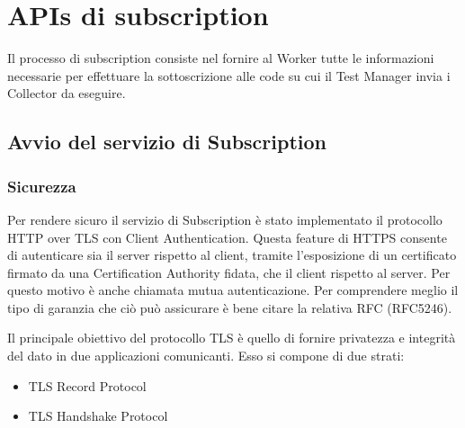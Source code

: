 \section{APIs di subscription}
Il processo di subscription consiste nel fornire al Worker tutte le informazioni necessarie per effettuare la sottoscrizione alle code su cui il Test Manager invia i Collector da eseguire.
\subsection{Avvio del servizio di Subscription}

\subsubsection{Sicurezza}
Per rendere sicuro il servizio di Subscription è stato implementato il protocollo HTTP over TLS con Client Authentication.
Questa feature di HTTPS consente di autenticare sia il server rispetto al client, tramite l'esposizione di un certificato firmato da una Certification Authority fidata, che il client rispetto al server. Per questo motivo è anche chiamata mutua autenticazione.\newline
Per comprendere meglio il tipo di garanzia che ciò può assicurare è bene citare la relativa RFC (RFC5246).\cite{RFC5246}

Il principale obiettivo del protocollo TLS è quello di fornire privatezza e integrità del dato in due applicazioni comunicanti.
Esso si compone di due strati:
\begin{itemize}
\item TLS Record Protocol
\item TLS Handshake Protocol
\end{itemize}

